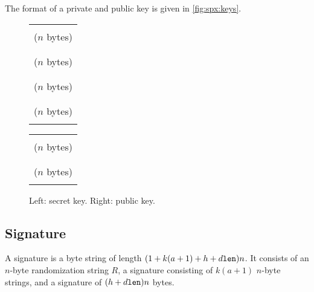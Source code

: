     The format of a \spx private and public key is given in \autoref{fig:spx:keys}.

\begin{figure} [h]
  \begin{center}
  \begin{minipage}{.4\textwidth}
        \begin{center}
	  \begin{tabular}{|c|}
	    \hline
	    \\[-0.5em] \sseed ($n$ bytes) \\[-0.5em] \\ \hline
	    \\[-0.5em] \skprf ($n$ bytes) \\[-0.5em] \\ \hline
	    \\[-0.5em] \pseed ($n$ bytes) \\[-0.5em] \\ \hline
	    \\[-0.5em] \proot ($n$ bytes) \\[-0.5em] \\ \hline
	  \end{tabular}
        \end{center}
      \end{minipage}
  \begin{minipage}{.4\textwidth}
      \begin{center}
	\begin{tabular}{|c|}
	    \hline
	    \\[-0.5em] \pseed ($n$ bytes) \\[-0.5em] \\ \hline
	    \\[-0.5em] \proot ($n$ bytes) \\[-0.5em] \\ \hline
	  \end{tabular}
        \end{center}
      \end{minipage}
  \end{center}
  \caption{Left: \spx secret key. Right: \spx public key.} 
  \label{fig:spx:keys}
\end{figure}

\subsection{\spx Signature}

   A \spx signature \htsig is a byte string of length $(1 + k(a + 1) + h + d\texttt{len})n$.  
   It consists of an $n$-byte randomization string $R$, a \fors signature 
   \forssig consisting of $k(a+1)$ $n$-byte strings, and a \hyper signature \htsig 
   of $(h + d\texttt{len})n$ bytes.

